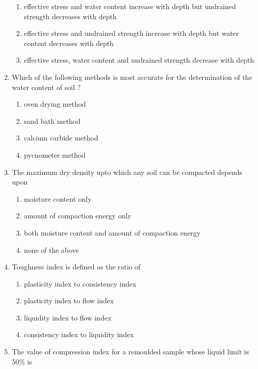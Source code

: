 \documentclass[11pt,a4paper]{article}
\begin{document}
\begin{enumerate}
\begin{enumerate}[label=\Alph*.]
\item{effective stress and water content increase with depth but undrained strength decreases with depth}
\item{effective stress and undrained strength increase with depth but water content decreases with depth}
\item{effective stress, water content and undrained strength decrease with depth}
\end{enumerate}
\item{Which of the following methods is most accurate for the determination of the water content of soil ?}
\begin{enumerate}[label=\Alph*.]
\item{oven drying method}
\item{sand bath method}
\item{calcium carbide method}
\item{pycnometer method}
\end{enumerate}
\item{The maximum dry density upto which any soil can be compacted depends upon}
\begin{enumerate}[label=\Alph*.]
\item{moisture content only}
\item{amount of compaction energy only}
\item{both moisture content and amount of compaction energy}
\item{none of the above}
\end{enumerate}
\item{Toughness index is defined as the ratio of}
\begin{enumerate}[label=\Alph*.]
\item{plasticity index to consistency index}
\item{plasticity index to flow index}
\item{liquidity index to flow index}
\item{consistency index to liquidity index}
\end{enumerate}
\item{The value of compression index for a remoulded sample whose liquid limit is 50\% is}
\\

\end{enumerate}
\end{document}
